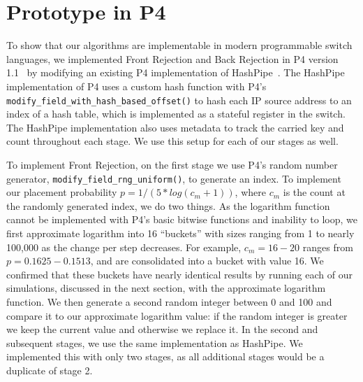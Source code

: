 \section{Prototype in P4}
\label{sec:prototype}
To show that our algorithms are implementable in modern programmable switch languages, we implemented Front Rejection and Back Rejection in P4 version 1.1~\cite{p4lang} by modifying an existing P4 implementation of HashPipe~\cite{p4code}. The HashPipe implementation of P4 uses a custom hash function with P4's \verb+modify_field_with_hash_based_offset()+ to hash each IP source address to an index of a hash table, which is implemented as a stateful register in the switch. The HashPipe implementation also uses metadata to track the carried key and count throughout each stage. We use this setup for each of our stages as well.

To implement Front Rejection, on the first stage we use P4's random number generator, \verb+modify_field_rng_uniform()+, to generate an index. To implement our placement probability $p = 1 / (5*log(c_m + 1))$, where $c_m$ is the count at the randomly generated index, we do two things. As the logarithm function cannot be implemented with P4's basic bitwise functions and inability to loop, we first approximate logarithm into 16 ``buckets'' with sizes ranging from 1 to nearly 100,000 as the change per step decreases. For example, $c_m = 16-20$ ranges from $p=0.1625-0.1513$, and are consolidated into a bucket with value 16. We confirmed that these buckets have nearly identical results by running each of our simulations, discussed in the next section, with the approximate logarithm function. We then generate a second random integer between 0 and 100 and compare it to our approximate logarithm value: if the random integer is greater we keep the current value and otherwise we replace it. In the second and subsequent stages, we use the same implementation as HashPipe. We implemented this with only two stages, as all additional stages would be a duplicate of stage 2.

